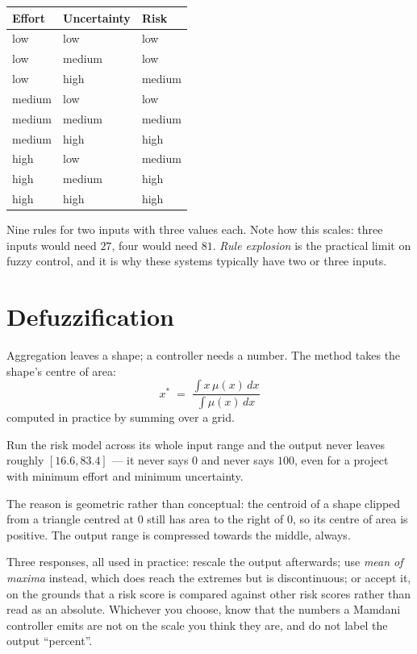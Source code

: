 \begin{examplebox}
\begin{tabular}{@{}L{4.5cm}L{4.5cm}L{5.4cm}@{}}
\toprule
\textbf{Effort} & \textbf{Uncertainty} & \textbf{Risk} \\
\midrule
low & low & low \\
low & medium & low \\
low & high & medium \\
medium & low & low \\
medium & medium & medium \\
medium & high & high \\
high & low & medium \\
high & medium & high \\
high & high & high \\
\bottomrule
\end{tabular}

\smallskip
Nine rules for two inputs with three values each. Note how this scales: three inputs
would need $27$, four would need $81$. \emph{Rule explosion} is the practical limit
on fuzzy control, and it is why these systems typically have two or three inputs.
\end{examplebox}

\section{Defuzzification}

Aggregation leaves a shape; a controller needs a number. The  method
takes the shape's centre of area:
\[
  x^{*} \;=\; \frac{\int x\, \mu(x)\, dx}{\int \mu(x)\, dx}
\]
computed in practice by summing over a grid.

\begin{alertbox}
Run the risk model across its whole input range and the output never leaves roughly
$[16.6, 83.4]$ --- it never says $0$ and never says $100$, even for a project with
minimum effort and minimum uncertainty.

The reason is geometric rather than conceptual: the centroid of a shape clipped from
a triangle centred at $0$ still has area to the right of $0$, so its centre of area
is positive. The output range is compressed towards the middle, always.

Three responses, all used in practice: rescale the output afterwards; use
\emph{mean of maxima} instead, which does reach the extremes but is discontinuous;
or accept it, on the grounds that a risk score is compared against other risk scores
rather than read as an absolute. Whichever you choose, know that the numbers a
Mamdani controller emits are not on the scale you think they are, and do not label
the output ``percent''.
\end{alertbox}

